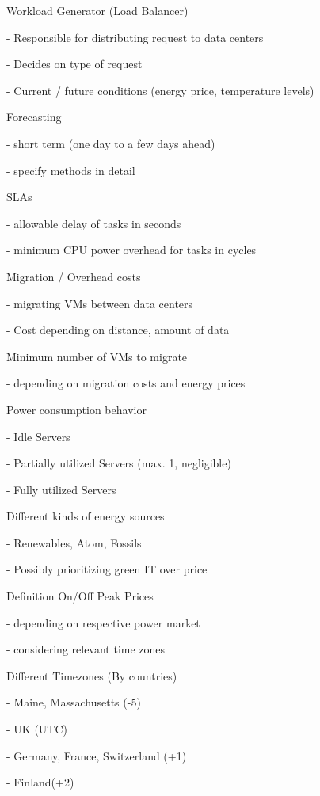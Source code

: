 \documentclass[a4paper]{article}
\begin{document}
\begin{itemize}
	\subitem Workload Generator (Load Balancer)
			
		\subsubitem - Responsible for distributing request to data centers
		
		\subsubitem - Decides on type of request
		
		\subsubitem - Current / future conditions (energy price, temperature levels) 
		
	\subitem Forecasting
	
		\subsubitem - short term (one day to a few days ahead)
		
		\subsubitem - specify methods in detail
		
	\subitem SLAs
	
		\subsubitem - allowable delay of tasks in seconds
		
		\subsubitem - minimum CPU power overhead for tasks in cycles

	\subitem Migration / Overhead costs
	
		\subsubitem - migrating VMs between data centers
		
		\subsubitem - Cost depending on distance, amount of data
		
	\subitem Minimum number of VMs to migrate
	
		\subsubitem - depending on migration costs and energy prices
			
	\subitem Power consumption behavior
	
		\subsubitem - Idle Servers
		
		\subsubitem - Partially utilized Servers (max. 1, negligible)
		
		\subsubitem - Fully utilized Servers
	
	\subitem Different kinds of energy sources
	
		\subsubitem - Renewables, Atom, Fossils
		
		\subsubitem - Possibly prioritizing green IT over price

	\subitem Definition On/Off Peak Prices
	
		\subsubitem - depending on respective power market
		
		\subsubitem - considering relevant time zones
		
	\subitem Different Timezones (By countries)

		\subsubitem - Maine, Massachusetts (-5) 

		\subsubitem - UK (UTC) 

		\subsubitem - Germany, France, Switzerland (+1) 

		\subsubitem - Finland(+2)
		

\end{itemize}
\end{document}
